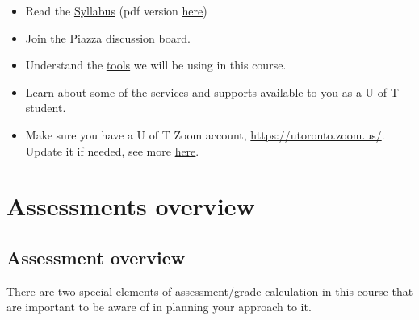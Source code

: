 \documentclass[
  openany]{book}
\begin{document}
\begin{itemize}
\item
  Read the \protect\hyperlink{syllabus}{Syllabus} (pdf version \href{https://sta303-bolton.github.io/sta303-w22-courseguide/other-files/STA303-1002_W22_syllabus.pdf}{here})
\item
  Join the \href{https://piazza.com/class/kx47tj4fmy65dg}{Piazza discussion board}.
\item
  Understand the \protect\hyperlink{course-tools-overview}{tools} we will be using in this course.
\item
  Learn about some of the \protect\hyperlink{student-support-services-and-resources}{services and supports} available to you as a U of T student.
\item
  Make sure you have a U of T Zoom account, \url{https://utoronto.zoom.us/}. Update it if needed, see more \protect\hyperlink{zoom-zoom-zoom-zoom}{here}.
\end{itemize}

\hypertarget{part-assessments-overview}{%
\part*{Assessments overview}\label{part-assessments-overview}}

\hypertarget{assessmentsoverview}{%
\chapter{Assessment overview}\label{assessmentsoverview}}

There are two special elements of assessment/grade calculation in this course that are important to be aware of in planning your approach to it.
\end{document}
